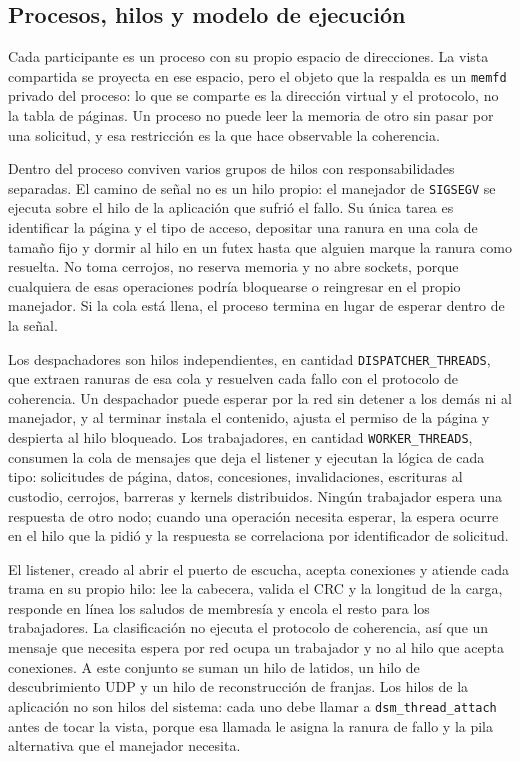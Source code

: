 \subsection{Procesos, hilos y modelo de ejecución}

Cada participante es un proceso con su propio espacio de direcciones. La vista compartida se proyecta en ese espacio, pero el objeto que la respalda es un \texttt{memfd} privado del proceso: lo que se comparte es la dirección virtual y el protocolo, no la tabla de páginas. Un proceso no puede leer la memoria de otro sin pasar por una solicitud, y esa restricción es la que hace observable la coherencia.

Dentro del proceso conviven varios grupos de hilos con responsabilidades separadas. El camino de señal no es un hilo propio: el manejador de \texttt{SIGSEGV} se ejecuta sobre el hilo de la aplicación que sufrió el fallo. Su única tarea es identificar la página y el tipo de acceso, depositar una ranura en una cola de tamaño fijo y dormir al hilo en un futex hasta que alguien marque la ranura como resuelta. No toma cerrojos, no reserva memoria y no abre sockets, porque cualquiera de esas operaciones podría bloquearse o reingresar en el propio manejador. Si la cola está llena, el proceso termina en lugar de esperar dentro de la señal.

Los despachadores son hilos independientes, en cantidad \texttt{DISPATCHER\_THREADS}, que extraen ranuras de esa cola y resuelven cada fallo con el protocolo de coherencia. Un despachador puede esperar por la red sin detener a los demás ni al manejador, y al terminar instala el contenido, ajusta el permiso de la página y despierta al hilo bloqueado. Los trabajadores, en cantidad \texttt{WORKER\_THREADS}, consumen la cola de mensajes que deja el listener y ejecutan la lógica de cada tipo: solicitudes de página, datos, concesiones, invalidaciones, escrituras al custodio, cerrojos, barreras y kernels distribuidos. Ningún trabajador espera una respuesta de otro nodo; cuando una operación necesita esperar, la espera ocurre en el hilo que la pidió y la respuesta se correlaciona por identificador de solicitud.

El listener, creado al abrir el puerto de escucha, acepta conexiones y atiende cada trama en su propio hilo: lee la cabecera, valida el CRC y la longitud de la carga, responde en línea los saludos de membresía y encola el resto para los trabajadores. La clasificación no ejecuta el protocolo de coherencia, así que un mensaje que necesita espera por red ocupa un trabajador y no al hilo que acepta conexiones. A este conjunto se suman un hilo de latidos, un hilo de descubrimiento UDP y un hilo de reconstrucción de franjas. Los hilos de la aplicación no son hilos del sistema: cada uno debe llamar a \texttt{dsm\_thread\_attach} antes de tocar la vista, porque esa llamada le asigna la ranura de fallo y la pila alternativa que el manejador necesita.

